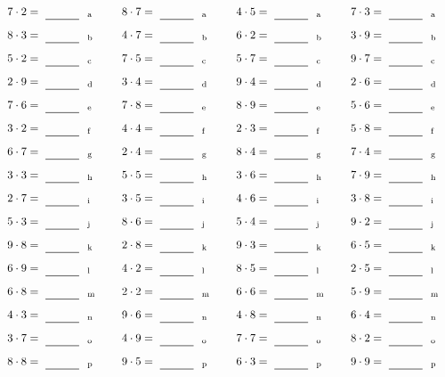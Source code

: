\documentclass
[
  draft    = true,
  fontsize = 11pt,
  parskip  = half-
]
{scrartcl}
\begin{document}
\par\vfill\par
\begin{align*}
    \pline{7\cdot2}&=\rline{a}
  & \pline{8\cdot7}&=\rline{a}
  & \pline{4\cdot5}&=\rline{a}
  & \pline{7\cdot3}&=\rline{a} \\[1ex]
    \pline{8\cdot3}&=\rline{b}
  & \pline{4\cdot7}&=\rline{b}
  & \pline{6\cdot2}&=\rline{b}
  & \pline{3\cdot9}&=\rline{b} \\[1ex]
    \pline{5\cdot2}&=\rline{c}
  & \pline{7\cdot5}&=\rline{c}
  & \pline{5\cdot7}&=\rline{c}
  & \pline{9\cdot7}&=\rline{c} \\[1ex]
    \pline{2\cdot9}&=\rline{d}
  & \pline{3\cdot4}&=\rline{d}
  & \pline{9\cdot4}&=\rline{d}
  & \pline{2\cdot6}&=\rline{d} \\[1ex]
    \pline{7\cdot6}&=\rline{e}
  & \pline{7\cdot8}&=\rline{e}
  & \pline{8\cdot9}&=\rline{e}
  & \pline{5\cdot6}&=\rline{e} \\[1ex]
    \pline{3\cdot2}&=\rline{f}
  & \pline{4\cdot4}&=\rline{f}
  & \pline{2\cdot3}&=\rline{f}
  & \pline{5\cdot8}&=\rline{f} \\[1ex]
    \pline{6\cdot7}&=\rline{g}
  & \pline{2\cdot4}&=\rline{g}
  & \pline{8\cdot4}&=\rline{g}
  & \pline{7\cdot4}&=\rline{g} \\[1ex]
    \pline{3\cdot3}&=\rline{h}
  & \pline{5\cdot5}&=\rline{h}
  & \pline{3\cdot6}&=\rline{h}
  & \pline{7\cdot9}&=\rline{h} \\[1ex]
    \pline{2\cdot7}&=\rline{i}
  & \pline{3\cdot5}&=\rline{i}
  & \pline{4\cdot6}&=\rline{i}
  & \pline{3\cdot8}&=\rline{i} \\[1ex]
    \pline{5\cdot3}&=\rline{j}
  & \pline{8\cdot6}&=\rline{j}
  & \pline{5\cdot4}&=\rline{j}
  & \pline{9\cdot2}&=\rline{j} \\[1ex]
    \pline{9\cdot8}&=\rline{k}
  & \pline{2\cdot8}&=\rline{k}
  & \pline{9\cdot3}&=\rline{k}
  & \pline{6\cdot5}&=\rline{k} \\[1ex]
    \pline{6\cdot9}&=\rline{l}
  & \pline{4\cdot2}&=\rline{l}
  & \pline{8\cdot5}&=\rline{l}
  & \pline{2\cdot5}&=\rline{l} \\[1ex]
    \pline{6\cdot8}&=\rline{m}
  & \pline{2\cdot2}&=\rline{m}
  & \pline{6\cdot6}&=\rline{m}
  & \pline{5\cdot9}&=\rline{m} \\[1ex]
    \pline{4\cdot3}&=\rline{n}
  & \pline{9\cdot6}&=\rline{n}
  & \pline{4\cdot8}&=\rline{n}
  & \pline{6\cdot4}&=\rline{n} \\[1ex]
    \pline{3\cdot7}&=\rline{o}
  & \pline{4\cdot9}&=\rline{o}
  & \pline{7\cdot7}&=\rline{o}
  & \pline{8\cdot2}&=\rline{o} \\[1ex]
    \pline{8\cdot8}&=\rline{p}
  & \pline{9\cdot5}&=\rline{p}
  & \pline{6\cdot3}&=\rline{p}
  & \pline{9\cdot9}&=\rline{p}
\end{align*}
\end{document}
